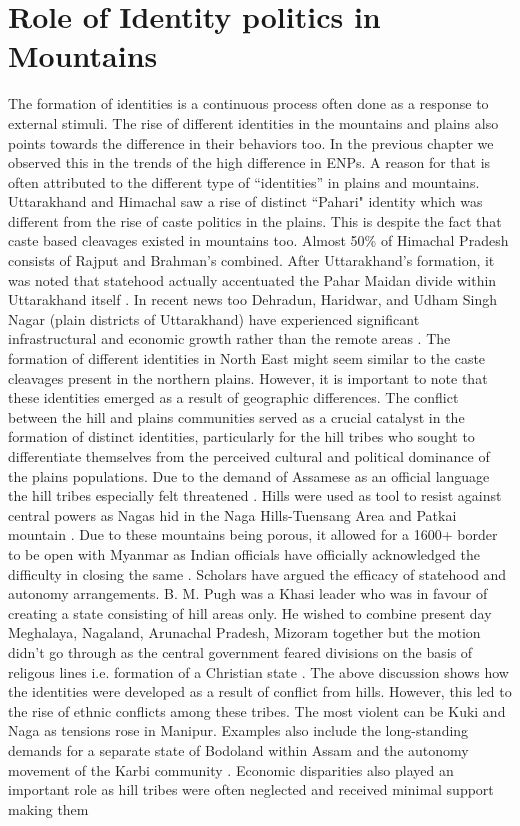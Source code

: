 \section{Role of Identity politics in Mountains}
\begin{sloppypar}
The formation of identities is a continuous process often done as a response to external stimuli. The rise of different identities in the mountains and plains also points towards the difference in their behaviors too. In the previous chapter we observed this in the trends of the high difference in ENPs. A reason for that is often attributed to the different type of ``identities'' in plains and mountains. Uttarakhand and Himachal saw a rise of distinct ``Pahari" identity \citep{mishra2000politics} which was different from the rise of caste politics in the plains. This is despite the fact that caste based cleavages existed in mountains too. Almost 50\% of Himachal Pradesh consists of Rajput and Brahman's combined. After Uttarakhand's formation, it was noted that statehood actually accentuated the Pahar Maidan divide within Uttarakhand itself \citep{mathur2015remote}. In recent news too Dehradun, Haridwar, and Udham Singh Nagar (plain districts of Uttarakhand) have experienced significant infrastructural and economic growth rather than the remote areas \citep{Mohammad_TOI}. The formation of different identities in North East might seem similar to the caste cleavages present in the northern plains. However, it is important to note that these identities emerged as a result of geographic differences. The conflict between the hill and plains communities served as a crucial catalyst in the formation of distinct identities, particularly for the hill tribes who sought to differentiate themselves from the perceived cultural and political dominance of the plains populations. Due to the demand of Assamese as an official language the hill tribes especially felt threatened \citep{inoue2005integration}. Hills were used as tool to resist against central powers as Nagas hid in the Naga Hills\hyp{}Tuensang Area and Patkai mountain \citep{kapai2020spatial}. Due to these mountains being porous, it allowed for a 1600+ border to be open with Myanmar as Indian officials have officially acknowledged the difficulty in closing the same \citep{Bureau_2024}. Scholars have argued the efficacy of statehood and autonomy arrangements.  B. M. Pugh was a Khasi leader who was in favour of creating a state consisting of hill areas only. He wished to combine present day Meghalaya, Nagaland, Arunachal Pradesh, Mizoram together but the motion didn't go through as the central government feared divisions on the basis of religous lines i.e. formation of a Christian state \citep{karlsson2013evading}. The above discussion shows how the identities were developed as a result of conflict from hills. However, this led to the rise of ethnic conflicts among these tribes. The most violent can be Kuki and Naga as tensions rose in Manipur.  Examples also include the long\hyp{}standing demands for a separate state of Bodoland within Assam  and the autonomy movement of the Karbi community \citep{sarma2017bodoland}. Economic disparities also played an important role as hill tribes were often neglected and received minimal support making them 
\end{sloppypar}

